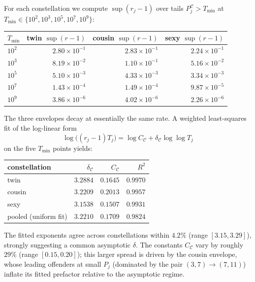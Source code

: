\documentclass[11pt]{article}
\begin{document}
For each constellation we compute $\sup(r_j-1)$ over tails
$P^{\mathcal{C}}_j>T_{\min}$ at
$T_{\min}\in\{10^2,10^3,10^5,10^7,10^9\}$:

\begin{center}
\begin{tabular}{lrrr}
\toprule
$T_{\min}$ & twin $\sup(r-1)$ & cousin $\sup(r-1)$ & sexy $\sup(r-1)$ \\
\midrule
$10^2$ & $2.80\times10^{-1}$ & $2.83\times10^{-1}$ & $2.24\times10^{-1}$ \\
$10^3$ & $8.19\times10^{-2}$ & $1.10\times10^{-1}$ & $5.16\times10^{-2}$ \\
$10^5$ & $5.10\times10^{-3}$ & $4.33\times10^{-3}$ & $3.34\times10^{-3}$ \\
$10^7$ & $1.43\times10^{-4}$ & $1.49\times10^{-4}$ & $9.87\times10^{-5}$ \\
$10^9$ & $3.86\times10^{-6}$ & $4.02\times10^{-6}$ & $2.26\times10^{-6}$ \\
\bottomrule
\end{tabular}
\end{center}

The three envelopes decay at essentially the same rate. A weighted
least-squares fit of the log-linear form
\[
\log\!\big((r_j-1)T_j\big)
=\log C_\mathcal{C}+\delta_\mathcal{C}\log\log T_j
\]
on the five $T_{\min}$ points yields:

\begin{center}
\begin{tabular}{lrrr}
\toprule
constellation & $\delta_\mathcal{C}$ & $C_\mathcal{C}$ & $R^2$ \\
\midrule
twin & $3.2884$ & $0.1645$ & $0.9970$ \\
cousin & $3.2209$ & $0.2013$ & $0.9957$ \\
sexy & $3.1538$ & $0.1507$ & $0.9931$ \\
\midrule
pooled (uniform fit) & $3.2210$ & $0.1709$ & $0.9824$ \\
\bottomrule
\end{tabular}
\end{center}

The fitted exponents agree across constellations within $4.2\%$
(range $[3.15,3.29]$), strongly suggesting a common asymptotic
$\delta$. The constants $C_\mathcal{C}$ vary by roughly $29\%$
(range $[0.15,0.20]$); this larger spread is driven by the cousin
envelope, whose leading offenders at small $P_j$ (dominated by the
pair $(3,7)\to(7,11)$) inflate its fitted prefactor relative to the
asymptotic regime.
\end{document}

